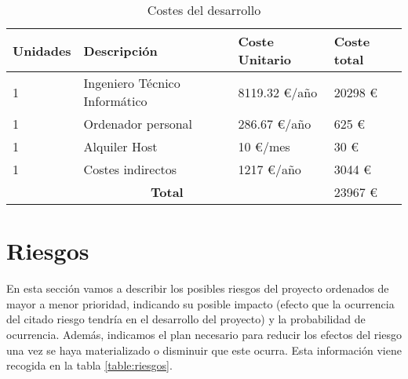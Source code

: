 \begin{table}[!hbt]
	\begin{center}
		\begin{tabular}{|p{2cm}|p{6cm}|p{2.5cm}|p{2.5cm}|}
			\hline
			\textbf{Unidades} & \textbf{Descripción} & \textbf{Coste Unitario} & \textbf{Coste total}\\
			\hline
			1 & Ingeniero Técnico Informático & 8119.32 \euro/año & 20298 \euro\\
			\hline
			1 & Ordenador personal & 286.67 \euro/año & 625 \euro\\
			\hline
			1 & Alquiler Host & 10 \euro/mes & 30 \euro\\
			\hline
			1 & Costes indirectos & 1217 \euro/año & 3044 \euro\\
			\hline
			\multicolumn{3}{|c|}{\textbf{Total}} & 23967 \euro\\
			\hline
		\end{tabular}
		\caption{Costes del desarrollo}
		\label{table:costes}
	\end{center}
\end{table}



\section{Riesgos}
En esta sección vamos a describir los posibles riesgos del proyecto ordenados de mayor a menor prioridad, indicando su posible impacto (efecto que la ocurrencia del citado riesgo tendría en el desarrollo del proyecto) y la probabilidad de ocurrencia. Además, indicamos el plan necesario para reducir los efectos del riesgo una vez se haya materializado o disminuir que este ocurra. Esta información viene recogida en la tabla \ref{table:riesgos}.

